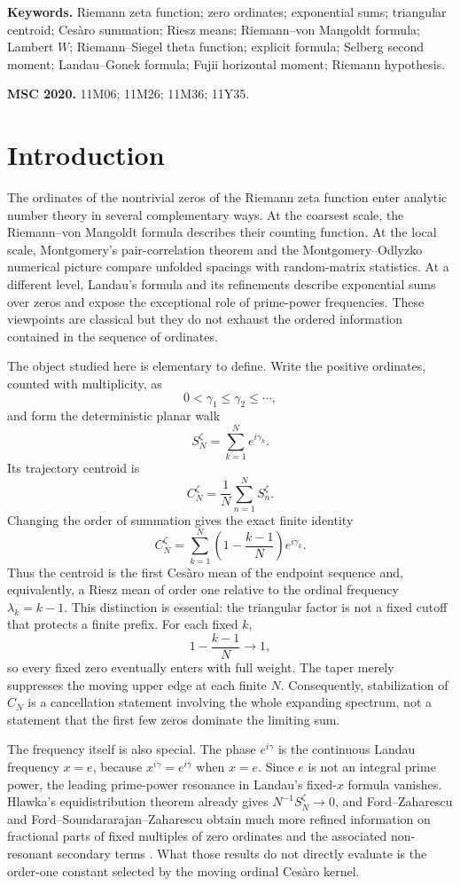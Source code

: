\documentclass[11pt]{article}
\theoremstyle{definition}
\theoremstyle{remark}
\begin{document}
\noindent\textbf{Keywords.} Riemann zeta function; zero ordinates; exponential sums; triangular centroid; Cesàro summation; Riesz means; Riemann--von Mangoldt formula; Lambert $W$; Riemann--Siegel theta function; explicit formula; Selberg second moment; Landau--Gonek formula; Fujii horizontal moment; Riemann hypothesis.

\medskip
\noindent\textbf{MSC 2020.} 11M06; 11M26; 11M36; 11Y35.

\tableofcontents
\newpage

\section{Introduction}

The ordinates of the nontrivial zeros of the Riemann zeta function enter analytic number theory in several complementary ways.  At the coarsest scale, the Riemann--von Mangoldt formula describes their counting function.  At the local scale, Montgomery's pair-correlation theorem and the Montgomery--Odlyzko numerical picture compare unfolded spacings with random-matrix statistics.  At a different level, Landau's formula and its refinements describe exponential sums over zeros and expose the exceptional role of prime-power frequencies.  These viewpoints are classical but they do not exhaust the ordered information contained in the sequence of ordinates.

The object studied here is elementary to define.  Write the positive ordinates, counted with multiplicity, as
\[
0<\gamma_1\leq\gamma_2\leq\cdots,
\]
and form the deterministic planar walk
\[
S_N^{\zeta}=\sum_{k=1}^N e^{i\gamma_k}.
\]
Its trajectory centroid is
\[
C_N^{\zeta}=\frac1N\sum_{n=1}^N S_n^{\zeta}.
\]
Changing the order of summation gives the exact finite identity
\[
C_N^{\zeta}
=\sum_{k=1}^{N}\left(1-\frac{k-1}{N}\right)e^{i\gamma_k}.
\]
Thus the centroid is the first Cesàro mean of the endpoint sequence and, equivalently, a Riesz mean of order one relative to the ordinal frequency $\lambda_k=k-1$.  This distinction is essential: the triangular factor is not a fixed cutoff that protects a finite prefix.  For each fixed $k$,
\[
1-\frac{k-1}{N}\longrightarrow1,
\]
so every fixed zero eventually enters with full weight.  The taper merely suppresses the moving upper edge at each finite $N$.  Consequently, stabilization of $C_N$ is a cancellation statement involving the whole expanding spectrum, not a statement that the first few zeros dominate the limiting sum.

The frequency itself is also special.  The phase $e^{i\gamma}$ is the continuous Landau frequency $x=e$, because $x^{i\gamma}=e^{i\gamma}$ when $x=e$.  Since $e$ is not an integral prime power, the leading prime-power resonance in Landau's fixed-$x$ formula vanishes.  Hlawka's equidistribution theorem already gives $N^{-1}S_N^{\zeta}\to0$, and Ford--Zaharescu and Ford--Soundararajan--Zaharescu obtain much more refined information on fractional parts of fixed multiples of zero ordinates and the associated non-resonant secondary terms \cite{Hlawka,FordZaharescu2005,FordSoundZaha2009}.  What those results do not directly evaluate is the order-one constant selected by the moving ordinal Cesàro kernel.
\end{document}
